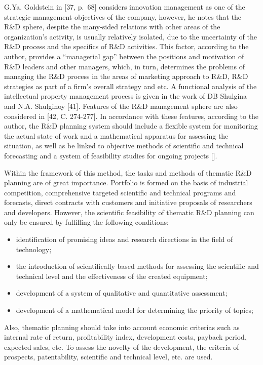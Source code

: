 \documentclass[12pt,twoside]{reedthesis}
\providecommand{\tightlist}{%
  \setlength{\itemsep}{0pt}\setlength{\parskip}{0pt}}
\begin{document}
G.Ya. Goldstein in {[}37, p.~68{]} considers innovation management as one of the strategic management objectives of the company, however, he notes that the R\&D sphere, despite the many-sided relations with other areas of the organization's activity, is usually relatively isolated, due to the uncertainty of the R\&D process and the specifics of R\&D activities. This factor, according to the author, provides a ``managerial gap'' between the positions and motivation of R\&D leaders and other managers, which, in turn, determines the problems of managing the R\&D process in the areas of marketing approach to R\&D, R\&D strategies as part of a firm's overall strategy and etc. A functional analysis of the intellectual property management process is given in the work of DB Shulgina and N.A. Shulginoy {[}41{]}. Features of the R\&D management sphere are also considered in {[}42, C. 274-277{]}. In accordance with these features, according to the author, the R\&D planning system should include a flexible system for monitoring the actual state of work and a mathematical apparatus for assessing the situation, as well as be linked to objective methods of scientific and technical forecasting and a system of feasibility studies for ongoing projects {[}{]}.

Within the framework of this method, the tasks and methods of thematic R\&D planning are of great importance. Portfolio is formed on the basis of industrial competition, comprehensive targeted scientific and technical programs and forecasts, direct contracts with customers and initiative proposals of researchers and developers. However, the scientific feasibility of thematic R\&D planning can only be ensured by fulfilling the following conditions:
\begin{itemize}
\tightlist
\item
  identification of promising ideas and research directions in the field of technology;
\item
  the introduction of scientifically based methods for assessing the scientific and technical level and the effectiveness of the created equipment;
\item
  development of a system of qualitative and quantitative assessment;
\item
  development of a mathematical model for determining the priority of topics;
\end{itemize}
Also, thematic planning should take into account economic criterias such as internal rate of return, profitability index, development costs, payback period, expected sales, etc. To assess the novelty of the development, the criteria of prospects, patentability, scientific and technical level, etc. are used.
\end{document}

